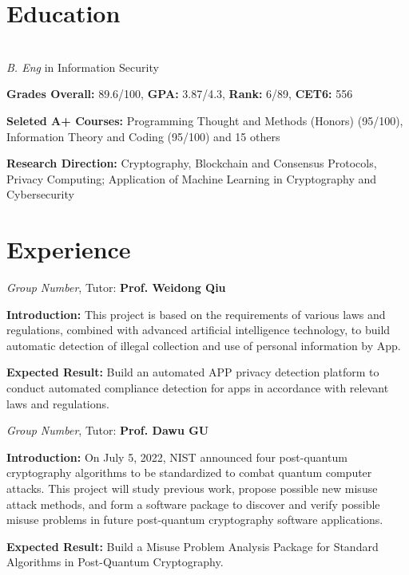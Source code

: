 \documentclass{cv_en}
\begin{document}
\section{Education}
  \\
\textit{B. Eng} in Information Security \\

\begin{zitemize}
  \item \textbf{Grades Overall:} 89.6/100, 
        \textbf{GPA:} 3.87/4.3, 
        \textbf{Rank:} 6/89, 
        \textbf{CET6:} 556
  \item \textbf{Seleted A+ Courses:} 
        Programming Thought and Methods (Honors) (95/100),
        Information Theory and Coding (95/100) 
        and 15 others
  \item \textbf{Research Direction:} 
        Cryptography, Blockchain and Consensus Protocols, Privacy Computing; Application of Machine Learning in Cryptography and Cybersecurity
\end{zitemize}

\section{Experience}
\textit{Group Number}, Tutor: \textbf{Prof. Weidong Qiu} 
\begin{zitemize}
  \item \textbf{Introduction:} This project is based on the requirements of various laws and regulations, combined with advanced artificial intelligence technology, to build automatic detection of illegal collection and use of personal information by App.
  \item \textbf{Expected Result:} Build an automated APP privacy detection platform to conduct automated compliance detection for apps in accordance with relevant laws and regulations.
\end{zitemize}

\textit{Group Number}, Tutor: \textbf{Prof. Dawu GU} 
\begin{zitemize}
  \item \textbf{Introduction:} On July 5, 2022, NIST announced four post-quantum cryptography algorithms to be standardized to combat quantum computer attacks. This project will study previous work, propose possible new misuse attack methods, and form a software package to discover and verify possible misuse problems in future post-quantum cryptography software applications.
  \item \textbf{Expected Result:} Build a Misuse Problem Analysis Package for Standard Algorithms in Post-Quantum Cryptography.
\end{zitemize}
\end{document}
